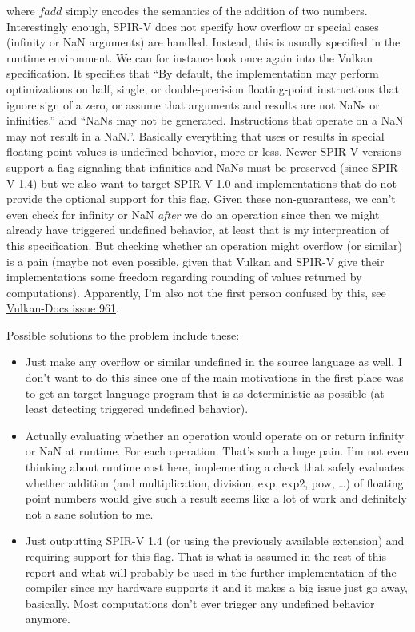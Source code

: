 \documentclass[letterpaper,12pt]{article}
\begin{document}
where $fadd$ simply encodes the semantics of the addition of two numbers.
Interestingly enough, SPIR-V does not specify how overflow or special
cases (infinity or NaN arguments) are handled. Instead, this is usually
specified in the runtime environment. We can for instance look once again into the Vulkan
specification. It specifies that ``By default, the implementation may 
perform optimizations on half, single, or double-precision floating-point 
instructions that ignore sign of a zero, or assume that arguments 
and results are not NaNs or infinities.'' and ``NaNs may not be generated. 
Instructions that operate on a NaN may not result in a NaN.''.
Basically everything that uses or results in special floating point
values is undefined behavior, more or less. 
Newer SPIR-V versions support a flag signaling that infinities and NaNs 
must be preserved (since SPIR-V 1.4) but we also want to target SPIR-V 1.0
and implementations that do not provide the optional support for
this flag.
Given these non-guarantess, we can't even check for infinity or NaN
\textit{after} we do an operation since then we might already have
triggered undefined behavior, at least that is my interpreation of
this specification. But checking whether an operation might overflow
(or similar) is a pain (maybe not even possible, given that Vulkan and
SPIR-V give their implementations some freedom regarding
rounding of values returned by computations).
Apparently, I'm also not the first person confused by this,
see \href{https://github.com/KhronosGroup/Vulkan-Docs/issues/961}{Vulkan-Docs issue 961}.

Possible solutions to the problem include these:

\begin{itemize}
	\item Just make any overflow or similar undefined in the source language
		as well. I don't want to do this since one of the main motivations
		in the first place was to get an target language program
		that is as deterministic as possible (at least detecting triggered
		undefined behavior).
	\item Actually evaluating whether an operation would operate on or
		return infinity or NaN at runtime. For each operation. That's
		such a huge pain. I'm not even thinking about runtime cost here,
		implementing a check that safely evaluates whether addition
		(and multiplication, division, exp, exp2, pow, \ldots) of floating
		point numbers would give such a result seems like a lot of work
		and definitely not a sane solution to me.
	\item Just outputting SPIR-V 1.4 (or using the previously available
		extension) and requiring support for this flag. That is what
		is assumed in the rest of this report and what will probably
		be used in the further implementation of the compiler since my hardware
		supports it and it makes a big issue just go away, basically. 
		Most computations don't ever trigger any undefined behavior
		anymore.
\end{itemize}
\end{document}

